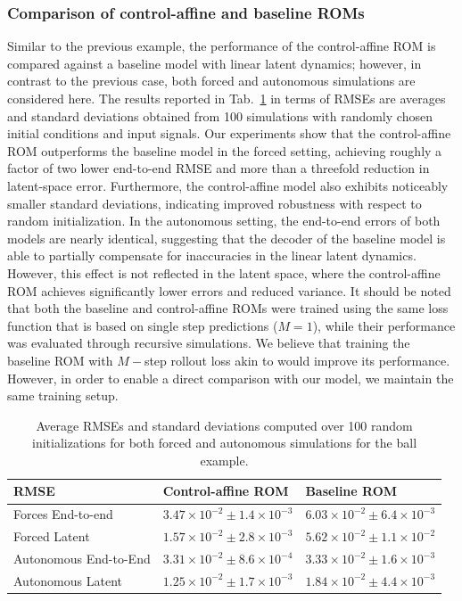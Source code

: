 \documentclass{article}
\begin{document}
\subsubsection{Comparison of control-affine and baseline ROMs}
Similar to the previous example, the performance of the control-affine ROM is compared against a baseline model with linear latent dynamics; however, in contrast to the previous case, both forced and autonomous simulations are considered here.
The results reported in Tab.~\ref{tab:CAvsLin} in terms of RMSEs are averages and standard deviations obtained from 100 simulations with randomly chosen initial conditions and input signals.
Our experiments show that the control-affine ROM outperforms the baseline model in the forced setting, achieving roughly a factor of two lower end-to-end RMSE and more than a threefold reduction in latent-space error.
Furthermore, the control-affine model also exhibits noticeably smaller standard deviations, indicating improved robustness with respect to random initialization.
In the autonomous setting, the end-to-end errors of both models are nearly identical, suggesting that the decoder of the baseline model is able to partially compensate for inaccuracies in the linear latent dynamics.
However, this effect is not reflected in the latent space, where the control-affine ROM achieves significantly lower errors and reduced variance.
It should be noted that both the baseline and control-affine ROMs were trained using the same loss function that is based on single step predictions ($M=1$), while their performance was evaluated through recursive simulations.
We believe that training the baseline ROM with $M-$step rollout loss akin to \cite{lusch2018deep} would improve its performance.
However, in order to enable a direct comparison with our model, we maintain the same training setup.
\begin{table}[ht]
\centering
\caption{Average RMSEs and standard deviations computed over 100 random initializations for both forced and autonomous simulations for the ball example.}
\label{tab:CAvsLin}
\begin{tabular}{lll}
\hline
 RMSE & Control-affine ROM & Baseline ROM \\
\hline
Forces End-to-end  & $3.47 \times 10^{-2} \pm 1.4\times10^{-3}$ & $6.03 \times 10^{-2} \pm 6.4\times10^{-3}$ \\
Forced Latent  & $1.57\times 10^{-2} \pm 2.8\times10^{-3}$ & $5.62 \times 10^{-2} \pm 1.1\times10^{-2}$ \\
Autonomous End-to-End  & $3.31\times 10^{-2} \pm 8.6\times10^{-4}$ & $3.33 \times 10^{-2} \pm 1.6\times10^{-3}$ \\
Autonomous Latent  & $1.25\times 10^{-2} \pm 1.7\times10^{-3}$ & $1.84 \times 10^{-2} \pm 4.4\times10^{-3}$ \\
\hline
\end{tabular}
\end{table}
\end{document}
